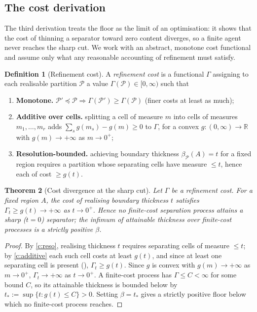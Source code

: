 \documentclass[11pt,a4paper]{article}
\theoremstyle{thmstyle}
\newtheorem{theorem}{Theorem}[section]
\theoremstyle{definition}
\newtheorem{definition}[theorem]{Definition}
\theoremstyle{remark}
\newcommand{\R}{\mathbb{R}}
\newcommand{\thick}{\beta}
\newcommand{\Part}{\mathscr{P}}
\begin{document}
\subsection{The cost derivation}

The third derivation treats the floor as the limit of an optimisation: it shows
that the cost of thinning a separator toward zero content diverges, so a finite
agent never reaches the sharp cut. We work with an abstract, monotone cost
functional and assume only what any reasonable accounting of refinement must
satisfy.

\begin{definition}[Refinement cost]
\label{def:cost}
A \emph{refinement cost} is a functional $\Gamma$ assigning to each realisable
partition $\Part$ a value $\Gamma(\Part)\in[0,\infty)$ such that
\begin{enumerate}[label=\textup{(C\arabic*)},leftmargin=3em]
\item\label{c:mono} \textbf{Monotone.} $\Part'\preceq\Part\Rightarrow
\Gamma(\Part')\ge\Gamma(\Part)$ \textup{(}finer costs at least as much\textup{)};
\item\label{c:additive} \textbf{Additive over cells.} splitting a cell of
measure $m$ into cells of measures $m_1,\dots,m_r$ adds
$\sum_s g(m_s)-g(m)\ge0$ to $\Gamma$, for a convex $g\colon(0,\infty)\to\R$
with $g(m)\to+\infty$ as $m\to0^+$;
\item\label{c:reso} \textbf{Resolution-bounded.} achieving boundary thickness
$\thick_\Part(A)=t$ for a fixed region requires a partition whose separating
cells have measure $\le t$, hence each of cost $\ge g(t)$.
\end{enumerate}
\end{definition}

\begin{theorem}[Cost divergence at the sharp cut]
\label{thm:cost}
Let $\Gamma$ be a refinement cost. For a fixed region $A$, the cost of realising
boundary thickness $t$ satisfies $\Gamma_t\ge g(t)\to+\infty$ as $t\to0^+$.
Hence no finite-cost separation process attains a sharp ($t=0$) separator; the
infimum of attainable thickness over finite-cost processes is a strictly
positive $\thick$.
\end{theorem}

\begin{proof}
By \ref{c:reso}, realising thickness $t$ requires separating cells of measure
$\le t$; by \ref{c:additive} each such cell costs at least $g(t)$, and since at
least one separating cell is present (),
$\Gamma_t\ge g(t)$. Since $g$ is convex with $g(m)\to+\infty$ as $m\to0^+$,
$\Gamma_t\to+\infty$ as $t\to0^+$. A finite-cost process has $\Gamma\le C<\infty$
for some bound $C$, so its attainable thickness is bounded below by
$t_\ast:=\sup\{t:g(t)\le C\}>0$. Setting $\thick=t_\ast$ gives a strictly
positive floor below which no finite-cost process reaches.
\end{proof}
\end{document}
